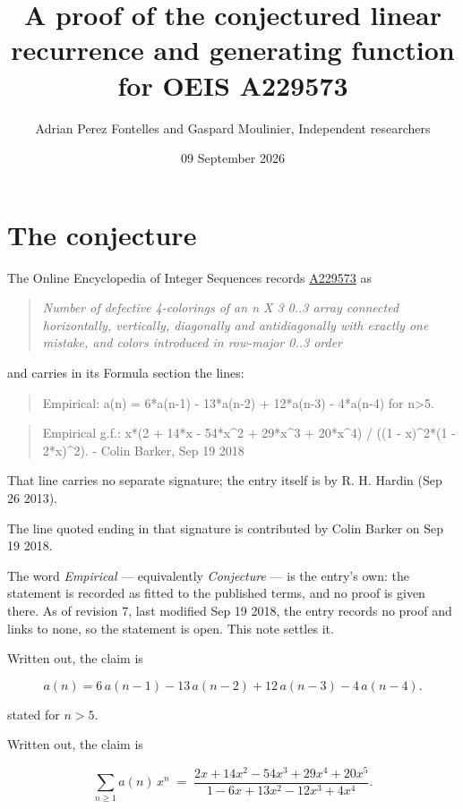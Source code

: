 \documentclass[11pt]{article}
\title{A proof of the conjectured linear recurrence and generating function for OEIS A229573}
\author{Adrian Perez Fontelles and Gaspard Moulinier, Independent researchers}
\date{09 September 2026}
\theoremstyle{definition}
\begin{document}
\maketitle
\section{The conjecture}

The Online Encyclopedia of Integer Sequences records \href{https://oeis.org/A229573}{A229573} as

\begin{quote}\itshape Number of defective 4-colorings of an n X 3 0..3 array connected horizontally, vertically, diagonally and antidiagonally with exactly one mistake, and colors introduced in row-major 0..3 order\end{quote}

and carries in its Formula section the lines:

\begin{quote}\ttfamily Empirical: a(n) = 6*a(n-1) - 13*a(n-2) + 12*a(n-3) - 4*a(n-4) for n>5.\end{quote}

\begin{quote}\ttfamily Empirical g.f.: x*(2 + 14*x - 54*x\textasciicircum{}2 + 29*x\textasciicircum{}3 + 20*x\textasciicircum{}4) / ((1 - x)\textasciicircum{}2*(1 - 2*x)\textasciicircum{}2). - Colin Barker, Sep 19 2018\end{quote}

That line carries no separate signature; the entry itself is by R. H. Hardin (Sep 26 2013).

The line quoted ending in that signature is contributed by Colin Barker on Sep 19 2018.

The word {\itshape Empirical} --- equivalently {\itshape Conjecture} --- is the entry's own: the statement is recorded as fitted to the published terms, and no proof is given there. As of revision 7, last modified Sep 19 2018, the entry records no proof and links to none, so the statement is open. This note settles it.

Written out, the claim is

\[a(n) = 6\,a(n-1) - 13\,a(n-2) + 12\,a(n-3) - 4\,a(n-4).\]

stated for $n > 5$.

Written out, the claim is

\[\sum_{n \ge 1} a(n)\,x^n \;=\; \frac{2x + 14x^{2} - 54x^{3} + 29x^{4} + 20x^{5}}{1 - 6x + 13x^{2} - 12x^{3} + 4x^{4}}.\]
\end{document}
